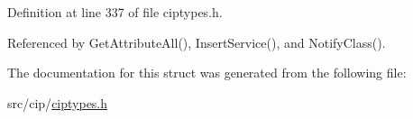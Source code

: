 \-Definition at line 337 of file ciptypes.\-h.



\-Referenced by \-Get\-Attribute\-All(), \-Insert\-Service(), and \-Notify\-Class().



\-The documentation for this struct was generated from the following file\-:\begin{DoxyCompactItemize}
\item 
src/cip/\hyperlink{ciptypes_8h}{ciptypes.\-h}\end{DoxyCompactItemize}
